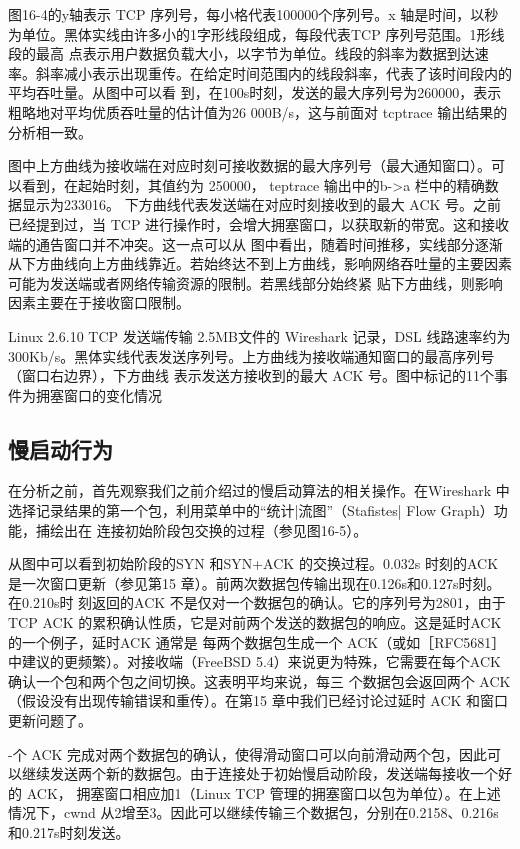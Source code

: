 图16-4的y轴表示 TCP 序列号，每小格代表100000个序列号。x 轴是时间，以秒为单位。黑体实线由许多小的1字形线段组成，每段代表TCP 序列号范围。1形线段的最高
点表示用户数据负载大小，以字节为单位。线段的斜率为数据到达速率。斜率减小表示出现重传。在给定时间范围内的线段斜率，代表了该时间段内的平均吞吐量。从图中可以看
到，在100s时刻，发送的最大序列号为260000，表示粗略地对平均优质吞吐量的估计值为26 000B/s，这与前面对 tcptrace 输出结果的分析相一致。

图中上方曲线为接收端在对应时刻可接收数据的最大序列号（最大通知窗口）。可以看到，在起始时刻，其值约为 250000， teptrace 输出中的b->a 栏中的精确数据显示为233016。
下方曲线代表发送端在对应时刻接收到的最大 ACK 号。之前已经提到过，当 TCP 进行操作时，会增大拥塞窗口，以获取新的带宽。这和接收端的通告窗口并不冲突。这一点可以从
图中看出，随着时间推移，实线部分逐渐从下方曲线向上方曲线靠近。若始终达不到上方曲线，影响网络吞吐量的主要因素可能为发送端或者网络传输资源的限制。若黑线部分始终紧
贴下方曲线，则影响因素主要在于接收窗口限制。

Linux 2.6.10 TCP 发送端传输 2.5MB文件的 Wireshark 记录，DSL 线路速率约为300Kb/s。黑体实线代表发送序列号。上方曲线为接收端通知窗口的最高序列号（窗口右边界），下方曲线
表示发送方接收到的最大 ACK 号。图中标记的11个事件为拥塞窗口的变化情况

\subsection{慢启动行为}
在分析之前，首先观察我们之前介绍过的慢启动算法的相关操作。在Wireshark 中选择记录结果的第一个包，利用菜单中的“统计|流图”（Stafistes| Flow Graph）功能，捕绘出在
连接初始阶段包交换的过程（参见图16-5）。

从图中可以看到初始阶段的SYN 和SYN+ACK 的交换过程。0.032s 时刻的ACK 是一次窗口更新（参见第15 章）。前两次数据包传输出现在0.126s和0.127s时刻。在0.210s时
刻返回的ACK 不是仅对一个数据包的确认。它的序列号为2801，由于 TCP ACK 的累积确认性质，它是对前两个发送的数据包的响应。这是延时ACK 的一个例子，延时ACK 通常是
每两个数据包生成一个 ACK（或如［RFC5681］ 中建议的更频繁）。对接收端（FreeBSD 5.4）来说更为特殊，它需要在每个ACK 确认一个包和两个包之间切换。这表明平均来说，每三
个数据包会返回两个 ACK（假设没有出现传输错误和重传）。在第15 章中我们已经讨论过延时 ACK 和窗口更新问题了。

-个 ACK 完成对两个数据包的确认，使得滑动窗口可以向前滑动两个包，因此可以继续发送两个新的数据包。由于连接处于初始慢启动阶段，发送端每接收一个好的 ACK，
拥塞窗口相应加1（Linux TCP 管理的拥塞窗口以包为单位）。在上述情况下，cwnd 从2增至3。因此可以继续传输三个数据包，分别在0.2158、0.216s 和0.217s时刻发送。

